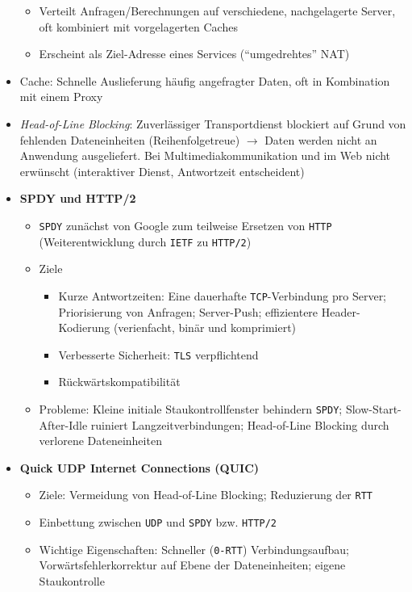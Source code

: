 \begin{itemize}
	\begin{itemize}
		\item Verteilt Anfragen/Berechnungen auf verschiedene, nachgelagerte Server, oft kombiniert mit vorgelagerten Caches
		\item Erscheint als Ziel-Adresse eines Services ("`umgedrehtes"' NAT)
	\end{itemize}
	\item Cache: Schnelle Auslieferung häufig angefragter Daten, oft in Kombination mit einem Proxy
	\item \textit{Head-of-Line Blocking}: Zuverlässiger Transportdienst blockiert auf Grund von fehlenden Dateneinheiten (Reihenfolgetreue) \(\rightarrow\) Daten werden nicht an Anwendung ausgeliefert. Bei Multimediakommunikation und im Web nicht erwünscht (interaktiver Dienst, Antwortzeit entscheident)
	\item \textbf{SPDY und HTTP/2}
	\begin{itemize}
		\item \texttt{SPDY} zunächst von Google zum teilweise Ersetzen von \texttt{HTTP} (Weiterentwicklung durch \texttt{IETF} zu \texttt{HTTP/2})
		\item Ziele
		\begin{itemize}
			\item Kurze Antwortzeiten: Eine dauerhafte \texttt{TCP}-Verbindung pro Server; Priorisierung von Anfragen; Server-Push; effizientere Header-Kodierung (verienfacht, binär und komprimiert)
			\item Verbesserte Sicherheit: \texttt{TLS} verpflichtend 
			\item Rückwärtskompatibilität
		\end{itemize}
		\item Probleme: Kleine initiale Staukontrollfenster behindern \texttt{SPDY}; Slow-Start-After-Idle ruiniert Langzeitverbindungen; Head-of-Line Blocking durch verlorene Dateneinheiten
	\end{itemize}
	\item \textbf{Quick UDP Internet Connections (QUIC)}
	\begin{itemize}
		\item Ziele: Vermeidung von Head-of-Line Blocking; Reduzierung der \texttt{RTT}
		\item Einbettung zwischen \texttt{UDP} und \texttt{SPDY} bzw. \texttt{HTTP/2}
		\item Wichtige Eigenschaften: Schneller (\texttt{0-RTT}) Verbindungsaufbau; Vorwärtsfehlerkorrektur auf Ebene der Dateneinheiten; eigene Staukontrolle
	\end{itemize}
\end{itemize}

